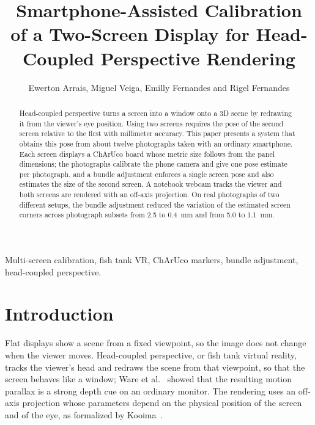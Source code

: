 \documentclass[english,hidelinks]{sbrt}
\begin{document}
\title{Smartphone-Assisted Calibration of a Two-Screen Display for Head-Coupled Perspective Rendering}

\author{Ewerton Arrais, Miguel Veiga, Emilly Fernandes and Rigel Fernandes}

\maketitle


\begin{abstract}
Head-coupled perspective turns a screen into a window onto a 3D scene by redrawing it from the viewer's eye position. Using two screens requires the pose of the second screen relative to the first with millimeter accuracy. This paper presents a system that obtains this pose from about twelve photographs taken with an ordinary smartphone. Each screen displays a ChArUco board whose metric size follows from the panel dimensions; the photographs calibrate the phone camera and give one pose estimate per photograph, and a bundle adjustment enforces a single screen pose and also estimates the size of the second screen. A notebook webcam tracks the viewer and both screens are rendered with an off-axis projection. On real photographs of two different setups, the bundle adjustment reduced the variation of the estimated screen corners across photograph subsets from 2.5 to 0.4~mm and from 5.0 to 1.1~mm.
\end{abstract}
\begin{keywords}
Multi-screen calibration, fish tank VR, ChArUco markers, bundle adjustment, head-coupled perspective.
\end{keywords}

\section{Introduction}

Flat displays show a scene from a fixed viewpoint, so the image does not change when the viewer moves. Head-coupled perspective, or fish tank virtual reality, tracks the viewer's head and redraws the scene from that viewpoint, so that the screen behaves like a window; Ware et al.~\cite{ware1993fish} showed that the resulting motion parallax is a strong depth cue on an ordinary monitor. The rendering uses an off-axis projection whose parameters depend on the physical position of the screen and of the eye, as formalized by Kooima~\cite{kooima2009generalized}.
\end{document}
